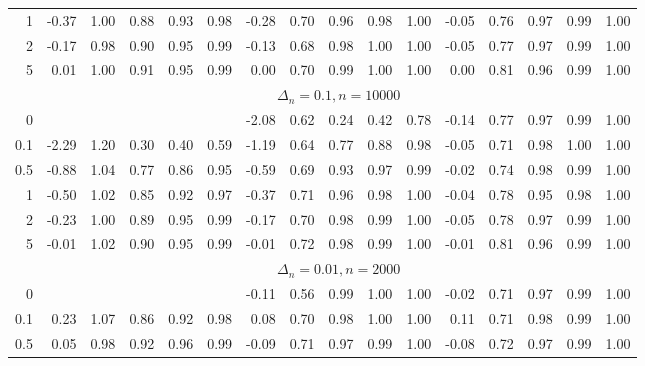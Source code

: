 \documentclass{article}
\theoremstyle{plain}
\theoremstyle{definition}
\theoremstyle{remark}
\begin{document}
\begin{appendix}
{\begin{table}[ht]
\begin{tabular}{r|rrrrr|rrrrr|rrrrr}
  1 & -0.37 & 1.00 & 0.88 & 0.93 & 0.98 & -0.28 & 0.70 & 0.96 & 0.98 & 1.00 & -0.05 & 0.76 & 0.97 & 0.99 & 1.00 \\ 
  2 & -0.17 & 0.98 & 0.90 & 0.95 & 0.99 & -0.13 & 0.68 & 0.98 & 1.00 & 1.00 & -0.05 & 0.77 & 0.97 & 0.99 & 1.00 \\ 
  5 & 0.01 & 1.00 & 0.91 & 0.95 & 0.99 & 0.00 & 0.70 & 0.99 & 1.00 & 1.00 & 0.00 & 0.81 & 0.96 & 0.99 & 1.00 \\  
		\midrule
	&\multicolumn{15}{c}{$\Delta_n=0.1, n= 10000$}
	\\
0 &  &  &  &  &  & -2.08 & 0.62 & 0.24 & 0.42 & 0.78 & -0.14 & 0.77 & 0.97 & 0.99 & 1.00 \\ 
  0.1 & -2.29 & 1.20 & 0.30 & 0.40 & 0.59 & -1.19 & 0.64 & 0.77 & 0.88 & 0.98 & -0.05 & 0.71 & 0.98 & 1.00 & 1.00 \\ 
  0.5 & -0.88 & 1.04 & 0.77 & 0.86 & 0.95 & -0.59 & 0.69 & 0.93 & 0.97 & 0.99 & -0.02 & 0.74 & 0.98 & 0.99 & 1.00 \\ 
  1 & -0.50 & 1.02 & 0.85 & 0.92 & 0.97 & -0.37 & 0.71 & 0.96 & 0.98 & 1.00 & -0.04 & 0.78 & 0.95 & 0.98 & 1.00 \\ 
  2 & -0.23 & 1.00 & 0.89 & 0.95 & 0.99 & -0.17 & 0.70 & 0.98 & 0.99 & 1.00 & -0.05 & 0.78 & 0.97 & 0.99 & 1.00 \\ 
  5 & -0.01 & 1.02 & 0.90 & 0.95 & 0.99 & -0.01 & 0.72 & 0.98 & 0.99 & 1.00 & -0.01 & 0.81 & 0.96 & 0.99 & 1.00 \\  
	\midrule
	\midrule
	&\multicolumn{15}{c}{$\Delta_n=0.01, n= 2000$}
	\\
0 &  &  &  &  &  & -0.11 & 0.56 & 0.99 & 1.00 & 1.00 & -0.02 & 0.71 & 0.97 & 0.99 & 1.00 \\ 
  0.1 & 0.23 & 1.07 & 0.86 & 0.92 & 0.98 & 0.08 & 0.70 & 0.98 & 1.00 & 1.00 & 0.11 & 0.71 & 0.98 & 0.99 & 1.00 \\ 
  0.5 & 0.05 & 0.98 & 0.92 & 0.96 & 0.99 & -0.09 & 0.71 & 0.97 & 0.99 & 1.00 & -0.08 & 0.72 & 0.97 & 0.99 & 1.00 \\ 

\end{tabular}
\end{table}}
\end{appendix}
\end{document}
